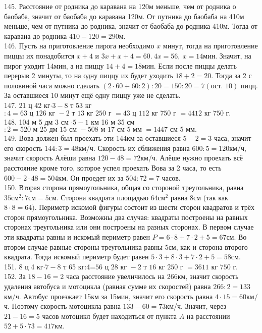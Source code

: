 145. Расстояние от родника до каравана на 120м меньше, чем от родника о баобаба, значит от баобаба до каравана 120м. От путника до баобаба на 410м меньше, чем от путника до родника, значит от баобаба до родника 410м. Тогда от каравана до родника $410-120=290$м.\\
146. Пусть на приготовление пирога необходимо $x$ минут, тогда на приготовление пиццы их понадобится $x+4$ и $3x+x+4=60.\ 4x=56,\ x=14$мин. Значит, на пирог уходит 14мин, а на пиццу $14+4=18$мин. Если после пиццы делать перерыв 2 минуты, то на одну пиццу их будет уходить $18+2=20.$ Тогда за 2 с половиной часа можно сделать $(2\cdot60+60:2):20=150:20=7 (\text{ост. 10})$ пицц. За оставшиеся 10 минут ещё одну пиццу уже не сделать.\\
147. 21 ц 42 кг$\cdot3-8$ т 53 кг$:4=63\text{ ц }126\text{ кг }-2\text{ т }13\text{ кг }250\text{ г }=43\text{ ц }112\text{ кг }750\text{ г }=4412\text{ кг }750\text{ г}.$\\
148. 104 м 5 дм 3 см $\cdot 5-1$ км 16 м 35 см$:2=520\text{ м }25\text{ дм }15\text{ см }-508\text{ м }17\text{ см }5\text{ мм }=1447\text{ см }5\text{ мм}.$\\
149. Вова должен был проехать эти 144км за оставшиеся $5-2=3$ часа, значит его скорость $144:3=48$км/ч. Скорость их сближения равна $600:5=120$км/ч, значит скорость Алёши равна $120-48=72$км/ч. Алёше нужно проехать всё расстояние кроме того, которое успел проехать Вова за 2 часа, то есть $600-2\cdot48=504$км. Он проедет их за $504:72=7$ часов.\\
150. Вторая сторона прямоугольника, общая со стороной треугольника, равна $35\text{см}^2:7\text{см}=5$см. Сторона квадрата площадью $64\text{см}^2$ равна 8см (так как $8\cdot8=64).$ Периметр искомой фигуры состоит из шести сторон квадратов и трёх сторон прямоугольника. Возможны два случая: квадраты построены на равных сторонах треугольника или они построены на разных сторонах. В первом случае эти квадраты равны и искомый периметр равен $P=6\cdot8+7\cdot2+5=67$см. Во втором случае равные стороны треугольника равны 5см, как и сторона второго квадрата. Тогда искомый периметр будет равен $5\cdot3+8\cdot3+7\cdot2+5=58$см.\\
151. 8 ц 4 кг$\cdot7-8$ т 65 кг:4=$56\text{ ц }28\text{ кг }-2\text{ т }16\text{ кг }250\text{ г }=3611\text{ кг }750\text{ г.}$\\
152. За $18-16=2$ часа расстояние увеличилось на 266км, значит скорость удаления автобуса и мотоцикла (равная сумме их скоростей) равна $266:2=133$км/ч. Автобус проезжает 15км за 15мин, значит его скорость равна $4\cdot15=60$км/ч. Поэтому скорость мотоцикла равна $133-60=73$км/ч. Значит, через $21-16=5$ часов мотоцикл будет находиться от пункта $A$ на расстоянии $52+5\cdot73=417$км.\\
